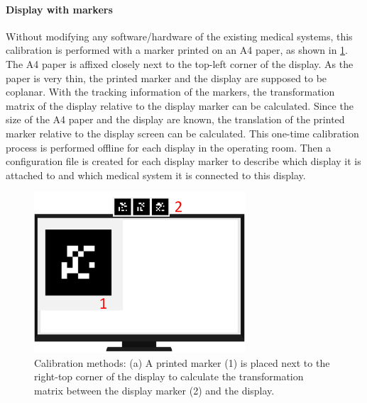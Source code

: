 \paragraph{Display with markers}
Without modifying any software/hardware of the existing medical systems, this calibration is performed with a marker printed on an A4 paper, as shown in  \figurename{\ref{fig:Calibration}}. 
The A4 paper is affixed closely next to the top-left corner of the display. As the paper is very thin, the printed marker and the display are supposed to be coplanar. With the tracking information of the markers, the transformation matrix of the display relative to the display marker can be calculated. Since the size of the A4 paper and the display are known, the translation of the printed marker relative to the display screen can be calculated. This one-time calibration process is performed offline for each display in the operating room. Then a configuration file is created for each display marker to describe which display it is attached to and which medical system it is connected to this display. 

\begin{figure}
	\centering
	\includegraphics[width=0.7\textwidth]{figures/4-PointingOR/Calibration}
	\caption{Calibration methods: (a) A printed marker (1) is placed next to the right-top corner of the display to calculate the transformation matrix between the display marker (2) and the display. }
	\label{fig:Calibration}       %
\end{figure}
